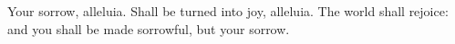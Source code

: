 Your sorrow, alleluia.
\versseparator
Shall be turned into joy, alleluia.
\versseparator
The world shall rejoice: and you shall be made sorrowful, but your sorrow.
